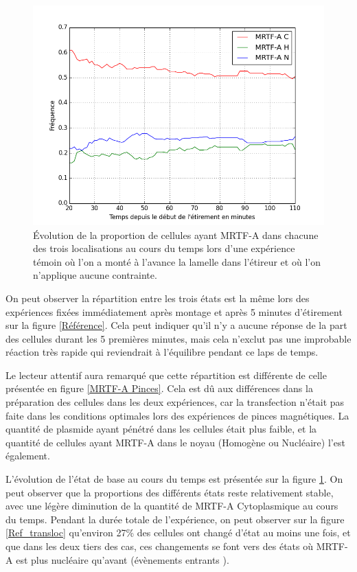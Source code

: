 \documentclass{report}
\begin{document}
\begin{figure}
\includegraphics[scale=0.4]{Figures/CHN_vs_Temps_reference.png} 
\caption{\label{Reference_dynamique} \'E{}volution de la proportion de cellules ayant MRTF-A dans chacune des trois localisations au cours du temps lors d'une expérience témoin où l'on a monté à l'avance la lamelle dans l'étireur et où l'on n'applique aucune contrainte.}
\end{figure}

On peut observer la répartition entre les trois états est la même lors des expériences fixées immédiatement après montage et après 5 minutes d'étirement sur la figure \ref{Référence}.
Cela peut indiquer qu'il n'y a aucune réponse de la part des cellules durant les 5 premières minutes, mais cela n'exclut pas une improbable réaction très rapide qui reviendrait à l'équilibre pendant ce laps de temps. 

Le lecteur attentif aura remarqué que cette répartition est différente de celle présentée en figure \ref{MRTF-A Pinces}. 
Cela est dû aux différences dans la préparation des cellules dans les deux expériences, car la transfection n'était pas faite dans les conditions optimales lors des expériences de pinces magnétiques. 
La quantité de plasmide ayant pénétré dans les cellules était plus faible, et la quantité de cellules ayant MRTF-A dans le noyau (Homogène ou Nucléaire) l'est également. 


L'évolution de l'état de base au cours du temps est présentée sur la figure \ref{Reference_dynamique}. On peut observer que la proportions des différents états reste relativement stable, avec une légère diminution de la quantité de MRTF-A Cytoplasmique au cours du temps. 
Pendant la durée totale de l'expérience, on peut observer sur la figure \ref{Ref_transloc} qu'environ 27\% des cellules ont changé d'état au moins une fois, et que dans les deux tiers des cas, ces changements se font vers des états où MRTF-A est plus nucléaire qu'avant (évènements \og entrants \fg). 
\end{document}
